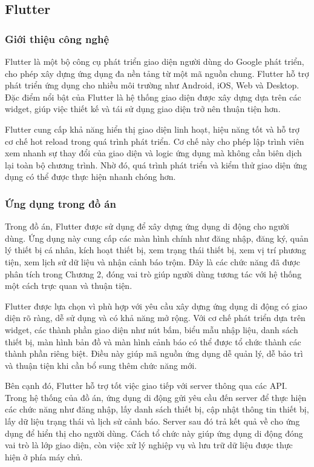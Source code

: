 \documentclass[../DoAn.tex]{subfiles}
\begin{document}
\subsection{Flutter}
\label{subsection:3.flutter}

\subsubsection{Giới thiệu công nghệ}

Flutter là một bộ công cụ phát triển giao diện người dùng do Google phát triển, cho phép xây dựng ứng dụng đa nền tảng từ một mã nguồn chung. Flutter hỗ trợ phát triển ứng dụng cho nhiều môi trường như Android, iOS, Web và Desktop. Đặc điểm nổi bật của Flutter là hệ thống giao diện được xây dựng dựa trên các widget, giúp việc thiết kế và tái sử dụng giao diện trở nên thuận tiện hơn.

Flutter cung cấp khả năng hiển thị giao diện linh hoạt, hiệu năng tốt và hỗ trợ cơ chế hot reload trong quá trình phát triển. Cơ chế này cho phép lập trình viên xem nhanh sự thay đổi của giao diện và logic ứng dụng mà không cần biên dịch lại toàn bộ chương trình. Nhờ đó, quá trình phát triển và kiểm thử giao diện ứng dụng có thể được thực hiện nhanh chóng hơn.

\subsubsection{Ứng dụng trong đồ án}

Trong đồ án, Flutter được sử dụng để xây dựng ứng dụng di động cho người dùng. Ứng dụng này cung cấp các màn hình chính như đăng nhập, đăng ký, quản lý thiết bị cá nhân, kích hoạt thiết bị, xem trạng thái thiết bị, xem vị trí phương tiện, xem lịch sử dữ liệu và nhận cảnh báo trộm. Đây là các chức năng đã được phân tích trong Chương 2, đóng vai trò giúp người dùng tương tác với hệ thống một cách trực quan và thuận tiện.

Flutter được lựa chọn vì phù hợp với yêu cầu xây dựng ứng dụng di động có giao diện rõ ràng, dễ sử dụng và có khả năng mở rộng. Với cơ chế phát triển dựa trên widget, các thành phần giao diện như nút bấm, biểu mẫu nhập liệu, danh sách thiết bị, màn hình bản đồ và màn hình cảnh báo có thể được tổ chức thành các thành phần riêng biệt. Điều này giúp mã nguồn ứng dụng dễ quản lý, dễ bảo trì và thuận tiện khi cần bổ sung thêm chức năng mới.

Bên cạnh đó, Flutter hỗ trợ tốt việc giao tiếp với server thông qua các API. Trong hệ thống của đồ án, ứng dụng di động gửi yêu cầu đến server để thực hiện các chức năng như đăng nhập, lấy danh sách thiết bị, cập nhật thông tin thiết bị, lấy dữ liệu trạng thái và lịch sử cảnh báo. Server sau đó trả kết quả về cho ứng dụng để hiển thị cho người dùng. Cách tổ chức này giúp ứng dụng di động đóng vai trò là lớp giao diện, còn việc xử lý nghiệp vụ và lưu trữ dữ liệu được thực hiện ở phía máy chủ.
\end{document}
